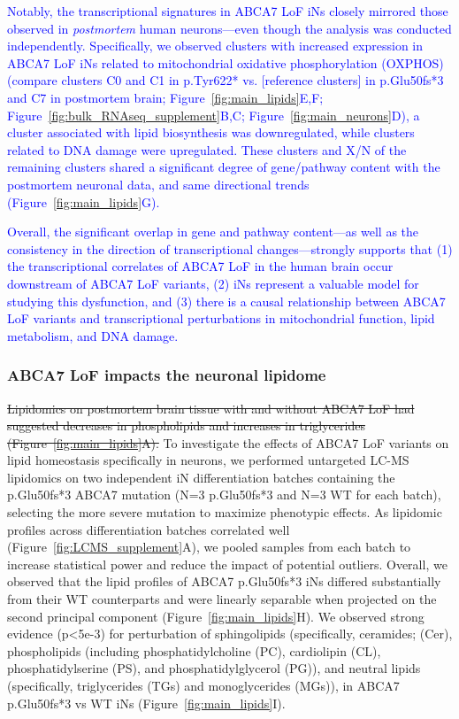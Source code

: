 \textcolor{blue}{Notably, the transcriptional signatures in ABCA7 LoF iNs closely mirrored those observed in \emph{postmortem} human neurons—even though the analysis was conducted independently. Specifically, we observed clusters with increased expression in ABCA7 LoF iNs related to mitochondrial oxidative phosphorylation (OXPHOS) (compare clusters C0 and C1 in p.Tyr622* vs. [reference clusters] in p.Glu50fs*3 and C7 in postmortem brain; Figure~\ref{fig:main_lipids}E,F; Figure~\ref{fig:bulk_RNAseq_supplement}B,C; Figure~\ref{fig:main_neurons}D), a cluster associated with lipid biosynthesis was downregulated, while clusters related to DNA damage were upregulated. These clusters and X/N of the remaining clusters shared a significant degree of gene/pathway content with the postmortem neuronal data, and same directional trends (Figure~\ref{fig:main_lipids}G).}

\textcolor{blue}{Overall, the significant overlap in gene and pathway content—as well as the consistency in the direction of transcriptional changes—strongly supports that (1) the transcriptional correlates of ABCA7 LoF in the human brain occur downstream of ABCA7 LoF variants, (2) iNs represent a valuable model for studying this dysfunction, and (3) there is a causal relationship between ABCA7 LoF variants and transcriptional perturbations in mitochondrial function, lipid metabolism, and DNA damage.}

\subsubsection{ABCA7 LoF impacts the neuronal lipidome}
\sout{Lipidomics on postmortem brain tissue with and without ABCA7 LoF had suggested decreases in phospholipids and increases in triglycerides (Figure~\ref{fig:main_lipids}A).} To investigate the effects of ABCA7 LoF variants on lipid homeostasis specifically in neurons, we performed untargeted LC-MS lipidomics on two independent iN differentiation batches containing the p.Glu50fs*3 ABCA7 mutation (N=3 p.Glu50fs*3 and N=3 WT for each batch), selecting the more severe mutation to maximize phenotypic effects. As lipidomic profiles across differentiation batches correlated well (Figure~\ref{fig:LCMS_supplement}A), we pooled samples from each batch to increase statistical power and reduce the impact of potential outliers. Overall, we observed that the lipid profiles of ABCA7 p.Glu50fs*3 iNs differed substantially from their WT counterparts and were linearly separable when projected on the second principal component (Figure~\ref{fig:main_lipids}H). We observed strong evidence (p<5e-3) for perturbation of sphingolipids (specifically, ceramides; (Cer), phospholipids (including phosphatidylcholine (PC), cardiolipin (CL), phosphatidylserine (PS), and phosphatidylglycerol (PG)), and neutral lipids (specifically, triglycerides (TGs) and monoglycerides (MGs)), in ABCA7 p.Glu50fs*3 vs WT iNs (Figure~\ref{fig:main_lipids}I). 

